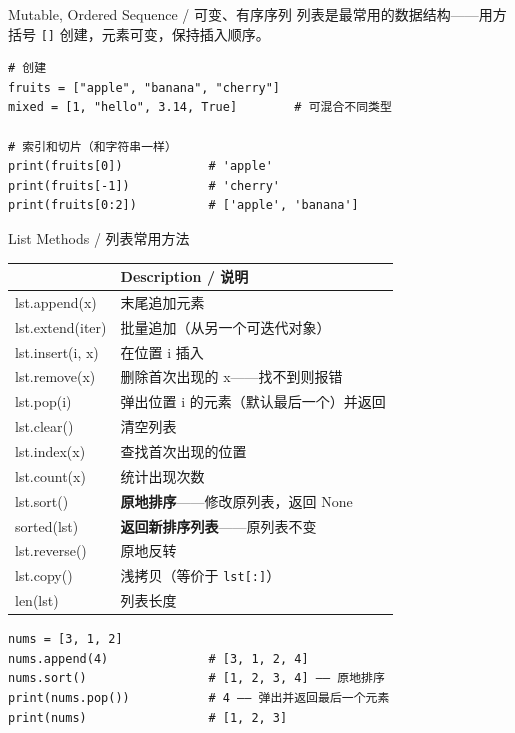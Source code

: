 \documentclass[11pt,a4paper]{report}
\let\oldtexttt\texttt
\renewcommand{\texttt}[1]{\textcolor{mainblue}{\oldtexttt{#1}}}
\begin{document}
\begin{concept}{Mutable, Ordered Sequence / 可变、有序序列}
列表是最常用的数据结构——用方括号 \texttt{[]} 创建，元素可变，保持插入顺序。
\begin{lstlisting}
# 创建
fruits = ["apple", "banana", "cherry"]
mixed = [1, "hello", 3.14, True]        # 可混合不同类型

# 索引和切片（和字符串一样）
print(fruits[0])            # 'apple'
print(fruits[-1])           # 'cherry'
print(fruits[0:2])          # ['apple', 'banana']
\end{lstlisting}
\end{concept}

\begin{concept}{List Methods / 列表常用方法}
\renewcommand{\arraystretch}{1.5}
\centering
\begin{tabularx}{\textwidth}{@{}>{\ttfamily}l>{\raggedright\arraybackslash}X@{}}
\toprule
\multicolumn{1}{@{}l}{\textbf{Method}} & \textbf{Description / 说明} \\ \midrule
lst.append(x)           & 末尾追加元素 \\
lst.extend(iter)        & 批量追加（从另一个可迭代对象） \\
lst.insert(i, x)        & 在位置 i 插入 \\
lst.remove(x)           & 删除首次出现的 x——找不到则报错 \\
lst.pop(i)              & 弹出位置 i 的元素（默认最后一个）并返回 \\
lst.clear()             & 清空列表 \\
lst.index(x)            & 查找首次出现的位置 \\
lst.count(x)            & 统计出现次数 \\
lst.sort()              & \textbf{原地排序}——修改原列表，返回 None \\
sorted(lst)             & \textbf{返回新排序列表}——原列表不变 \\
lst.reverse()           & 原地反转 \\
lst.copy()              & 浅拷贝（等价于 \texttt{lst[:]}） \\
len(lst)                & 列表长度 \\
\bottomrule
\end{tabularx}
\medskip

\begin{lstlisting}
nums = [3, 1, 2]
nums.append(4)              # [3, 1, 2, 4]
nums.sort()                 # [1, 2, 3, 4] —— 原地排序
print(nums.pop())           # 4 —— 弹出并返回最后一个元素
print(nums)                 # [1, 2, 3]
\end{lstlisting}
\end{concept}
\end{document}
